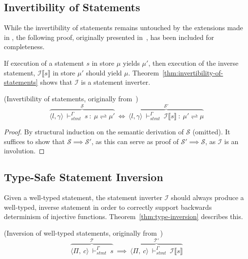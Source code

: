 \subsection{Invertibility of Statements}
\label{subsec:invertibility-of-statements}
While the invertibility of statements remains untouched by the extensions made in \rooplpp, the following proof, originally presented in~\cite{th:roopl}, has been included for completeness.

If execution of a statement $s$ in store $\mu$ yields $\mu'$, then execution of the inverse statement, $\mathcal{I} \llbracket s \rrbracket$ in store $\mu'$ should yield $\mu$. Theorem~\ref{thm:invertibility-of-statements} shows that $\mathcal{I}$ is a statement inverter.\\

\begin{theorem}\label{thm:invertibility-of-statements}(Invertibility of statements, originally from~\cite{th:roopl})
    \begin{equation*}
        \overbrace{\langle l, \gamma \rangle\ \vdash_{stmt}^\Gamma\ s\ :\ \mu \rightleftharpoons \mu'}^{\mathcal{S}}\ \Longleftrightarrow\ \overbrace{\langle l, \gamma \rangle\ \vdash_{stmt}^\Gamma\ \mathcal{I}\llbracket s\rrbracket\ :\ \mu' \rightleftharpoons \mu}^{\mathcal{S}'}
    \end{equation*}
\end{theorem}

\begin{proof}\let\qed\relax
    By structural induction on the semantic derivation of $\mathcal{S}$ (omitted). It suffices to show that $\mathcal{S} \implies \mathcal{S}'$, as this can serve as proof of $\mathcal{S}' \implies \mathcal{S}$, as $\mathcal{I}$ is an involution.
\end{proof}    

\subsection{Type-Safe Statement Inversion}
\label{subsec:type-safe-statement-inversion}
Given a well-typed statement, the statement inverter $\mathcal{I}$ should always produce a well-typed, inverse statement in order to correctly support backwards determinism of injective functions. Theorem~\ref{thm:type-inversion} describes this.

\begin{theorem}\label{thm:type-inversion}(Inversion of well-typed statements, originally from~\cite{th:roopl})
    \begin{equation*}
        \overbrace{\langle \Pi,\ c\rangle\ \vdash_{stmt}^\Gamma\ s}^{\mathcal{T}}\ \implies\ \overbrace{\langle \Pi,\ c\rangle\ \vdash_{stmt}^\Gamma\ \mathcal{I}\llbracket s\rrbracket}^{\mathcal{T}'}
    \end{equation*}
\end{theorem}

